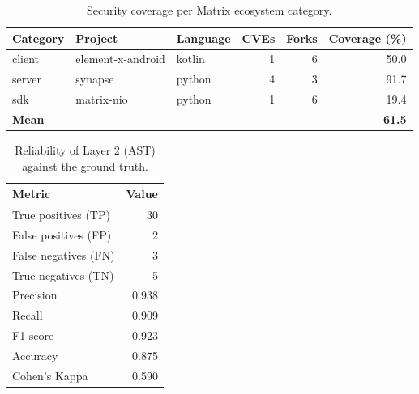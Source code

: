 \begin{table}[ht]\centering
\caption{Security coverage per Matrix ecosystem category.}
\label{tab:cobertura}
\begin{tabular}{lllrrr}
\hline
Category & Project & Language & CVEs & Forks & Coverage (\%) \\ \hline
client & element-x-android & kotlin & 1 & 6 & 50.0 \\
server & synapse & python & 4 & 3 & 91.7 \\
sdk & matrix-nio & python & 1 & 6 & 19.4 \\
\hline
\textbf{Mean} & & & & & \textbf{61.5} \\
\hline
\end{tabular}
\end{table}

\begin{table}[ht]\centering
\caption{Reliability of Layer 2 (AST) against the ground truth.}
\label{tab:metricas}
\begin{tabular}{lr}
\hline
Metric & Value \\ \hline
True positives (TP) & 30 \\
False positives (FP) & 2 \\
False negatives (FN) & 3 \\
True negatives (TN) & 5 \\
Precision & 0.938 \\
Recall & 0.909 \\
F1-score & 0.923 \\
Accuracy & 0.875 \\
Cohen's Kappa & 0.590 \\
\hline
\end{tabular}
\end{table}
